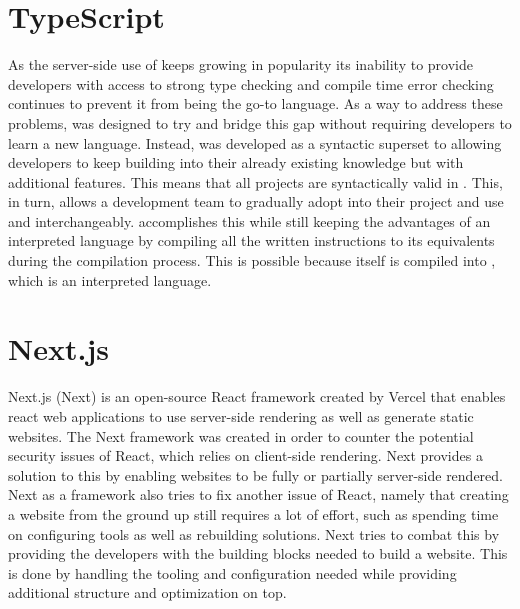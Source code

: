 \section*{TypeScript}
As the server-side use of \javascript{} keeps growing in popularity its inability to provide developers with access to strong type checking and compile time error checking continues to prevent it from being the go-to language.
As a way to address these problems, \typescript{} was designed to try and bridge this gap without requiring developers to learn a new language.
Instead, \typescript{} was developed as a syntactic superset to \javascript{} allowing developers to keep building into their already existing knowledge but with additional features.
This means that all \javascript{} projects are syntactically valid in \typescript{}. This, in turn, allows a development team to gradually adopt \typescript{} into their project and use \typescript{} and \javascript{} interchangeably\cite{TypeScript}.
\typescript{} accomplishes this while still keeping the advantages of an interpreted language by compiling all the written instructions to its \javascript{} equivalents during the compilation process.
This is possible because \typescript{} itself is compiled into \javascript{}, which is an interpreted language.

\section*{Next.js}
Next.js (Next) is an open-source React framework created by Vercel that enables react web applications to use server-side rendering as well as generate static websites. The Next framework was created in order to counter the potential security issues of React, which relies on client-side rendering. Next provides a solution to this by enabling websites to be fully or partially server-side rendered\cite {Nextjs_Docks}. 
Next as a framework also tries to fix another issue of React, namely that creating a website from the ground up still requires a lot of effort, such as spending time on configuring tools as well as rebuilding solutions. 
Next tries to combat this by providing the developers with the building blocks needed to build a website.
This is done by handling the tooling and configuration needed while providing additional structure and optimization on top\cite{Nextjs_Docks}.



